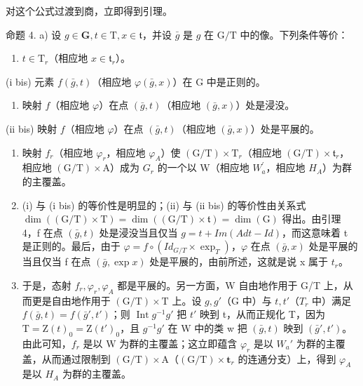对这个公式过渡到商，立即得到引理。

命题 4. a) 设 \(g \in \mathbf{G}, t \in \mathrm{T}, x \in \mathfrak{t}\)，并设 \(\bar{g}\) 是 \(g\) 在 \(\mathrm{G} / \mathrm{T}\) 中的像。下列条件等价：

\begin{enumerate}
\def\labelenumi{(\roman{enumi})}
\tightlist
\item
  \(t \in \mathrm{T}_r\)（相应地 \(x \in \mathfrak{t}_r\)）。
\end{enumerate}

(i bis) 元素 \(f(\bar{g}, t)\)（相应地 \(\varphi(\bar{g}, x)\)）在 G 中是正则的。

\begin{enumerate}
\def\labelenumi{(\roman{enumi})}
\setcounter{enumi}{1}
\tightlist
\item
  映射 \(f\)（相应地 \(\varphi\)）在点 \((\bar{g}, t)\)（相应地 \((\bar{g}, x)\)）处是浸没。
\end{enumerate}

(ii bis) 映射 \(f\)（相应地 \(\varphi\)）在点 \((\bar{g}, t)\)（相应地 \((\bar{g}, x)\)）处是平展的。

\begin{enumerate}
\def\labelenumi{\alph{enumi})}
\setcounter{enumi}{1}
\item
  映射 \(f_{r}\)（相应地 \(\varphi_{r}\)，相应地 \(\varphi_{A}\)）使 \((\mathrm{G}/\mathrm{T}) \times \mathrm{T}_{r}\)（相应地 \((\mathrm{G}/\mathrm{T}) \times \mathfrak{t}_{r}\)，相应地 \((\mathrm{G}/\mathrm{T}) \times \mathrm{A}\)）成为 \(G_{r}\) 的一个以 W（相应地 \(W_{a}^{\prime}\)，相应地 \(H_{A}\)）为群的主覆盖。
\item
  (i) 与 (i bis) 的等价性是明显的；(ii) 与 (ii bis) 的等价性由关系式 \(\dim((\mathrm{G}/\mathrm{T})\times\mathrm{T})=\dim((\mathrm{G}/\mathrm{T})\times\mathfrak{t})=\dim(\mathrm{G})\) 得出。由引理 4，f 在点 \((\bar{g},t)\) 处是浸没当且仅当 \(g=t+Im(Ad t-Id)\)，而这意味着 t 是正则的。最后，由于 \(\varphi=f\circ(Id_{G/T}\times\exp_{T})\)，\(\varphi\) 在点 \((\bar{g},x)\) 处是平展的当且仅当 f 在点 \((\bar{g},\exp x)\) 处是平展的，由前所述，这就是说 x 属于 \(t_{r}\)。
\item
  于是，态射 \(f_{r}, \varphi_{r}, \varphi_{A}\) 都是平展的。另一方面，W 自由地作用于 G/T 上，从而更是自由地作用于 \((\mathrm{G}/\mathrm{T}) \times \mathrm{T}\) 上。设 \(g, g'\)（G 中）与 \(t, t'\)（\(T_{r}\) 中）满足 \(f(\bar{g}, t) = f(\bar{g}', t')\)；则 \(\operatorname{Int} g^{-1} g'\) 把 \(t'\) 映到 t，从而正规化 T，因为 \(\mathrm{T} = \mathrm{Z}(t)_{0} = \mathrm{Z}(t')_{0}\)，且 \(g^{-1} g'\) 在 W 中的类 w 把 \((\bar{g}, t)\) 映到 \((\bar{g}', t')\)。由此可知，\(f_{r}\) 是以 W 为群的主覆盖；这立即蕴含 \(\varphi_{r}\) 是以 \(W_{a}'\) 为群的主覆盖，从而通过限制到 \((\mathrm{G}/\mathrm{T}) \times \mathrm{A}\)（\((\mathrm{G}/\mathrm{T}) \times \mathbf{t}_{r}\) 的连通分支）上，得到 \(\varphi_{A}\) 是以 \(H_{A}\) 为群的主覆盖。
\end{enumerate}

